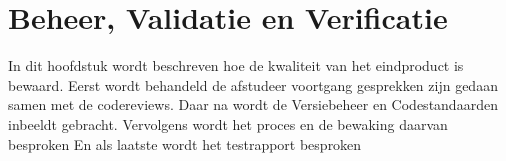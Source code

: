 \chapter{Beheer, Validatie en Verificatie}
In dit hoofdstuk wordt beschreven hoe de kwaliteit van het eindproduct is bewaard.
Eerst wordt behandeld de afstudeer voortgang gesprekken zijn gedaan samen met de codereviews.
Daar na wordt de Versiebeheer en Codestandaarden inbeeldt gebracht.
Vervolgens  wordt het proces en de bewaking daarvan besproken
En als laatste wordt het testrapport besproken
% 
% 
%





\newpage


